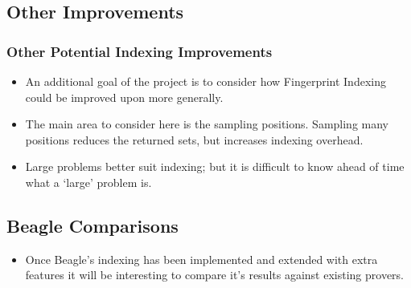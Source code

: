 \documentclass[10pt]{beamer}
\begin{document}
\begin{NoHyper}
\subsection{Other Improvements}
\begin{frame}
  \frametitle{Other Potential Indexing Improvements}
  \begin{itemize}
  \item<1-> An additional goal of the project is to consider how Fingerprint Indexing
  could be improved upon more generally.
  \item<2-> The main area to consider here is the sampling positions. Sampling many
  positions reduces the returned sets, but increases indexing overhead.
  \item<3-> Large problems better suit indexing; but it is difficult to know ahead of
  time what a `large' problem is.
  \end{itemize}
\end{frame}

\subsection{Beagle Comparisons}
\begin{frame}
  \begin{itemize}
  \frametitle{Comparing Beagle With Other FOL Provers}
  \item<1-> Once Beagle's indexing has been implemented and extended with extra features
  it will be interesting to compare it's results against existing provers.
  \end{itemize}
\end{frame}


\end{NoHyper}
\end{document}

